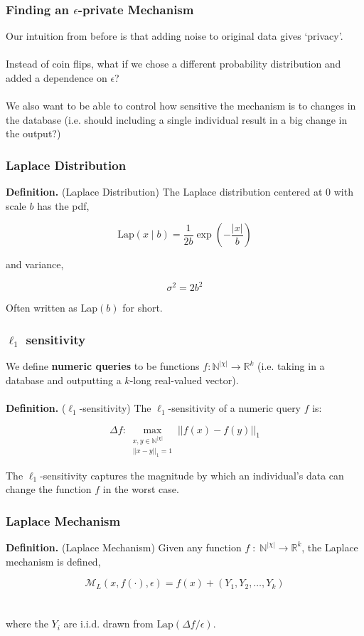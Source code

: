 \documentclass[aspectratio=169]{beamer}
\newcommand{\emm}{\mathcal{M}}
\newcommand{\dbd}{\mathbb{N}^{|\chi|}}
\begin{document}
\begin{frame}
\frametitle{Finding an $\epsilon$-private Mechanism}
Our intuition from before is that adding noise to original data gives `privacy'.\\~\\

Instead of coin flips, what if we chose a different probability distribution and added a dependence on $\epsilon$?\\~\\

We also want to be able to control how sensitive the mechanism is to changes in the database (i.e. should including a single individual result in a big change in the output?)
\end{frame}

\begin{frame}
\frametitle{Laplace Distribution}

\textbf{Definition.} (Laplace Distribution) The Laplace distribution centered at 0 with scale $b$ has the pdf,

$$\text{Lap}(x\mid b) = \frac{1}{2b} \exp(-\frac{|x|}{b})$$

and variance,

$$\sigma^2 = 2b^2$$

Often written as Lap$(b)$ for short.
\end{frame}

\begin{frame}
\frametitle{$\ell_1$ sensitivity}

We define \textbf{numeric queries} to be functions $f: \dbd \rightarrow \mathbb{R}^k$ (i.e. taking in a database and outputting a $k$-long real-valued vector).\\~\\

\textbf{Definition.} ($\ell_1$-sensitivity) The $\ell_1$-sensitivity of a numeric query $f$ is: 

$$\Delta f: \max_{\substack{x,y \in \dbd\\ ||x-y||_1 = 1}} ||f(x) - f(y)||_1$$

The $\ell_1$-sensitivity captures the magnitude by which an individual's data can change the function $f$ in the worst case.
\end{frame}

\begin{frame}
\frametitle{Laplace Mechanism}

\textbf{Definition.} (Laplace Mechanism) Given any function $f\;:\; \dbd \rightarrow \mathbb{R}^k$, the Laplace mechanism is defined,

$$\emm_L(x, f(\cdot), \epsilon) = f(x) + (Y_1, Y_2, \dots, Y_k)$$\\~\\

where the $Y_i$ are i.i.d. drawn from $\text{Lap}(\Delta f/\epsilon)$.
\end{frame}
\end{document}

